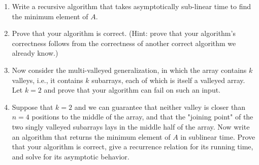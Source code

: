 \documentclass[12pt]{article}
\begin{document}
\begin{enumerate}
    \begin{enumerate}
        \item Write a recursive algorithm that takes asymptotically sub-linear time to find the minimum element of $A$.
        \item Prove that your algorithm is correct. (Hint: prove that your algorithm's correctness follows from the correctness of another correct algorithm we already know.)
        \item Now consider the multi-valleyed generalization, in which the array contains $k$ valleys, i.e., it contains $k$ subarrays, each of which is itself a valleyed array. Let $k = 2$ and prove that your algorithm can fail on such an input.
        \item Suppose that $k = 2$ and we can guarantee that neither valley is closer than $n=4$ positions to the middle of the array, and that the "joining point" of the two singly valleyed subarrays lays in the middle half of the array. Now write an algorithm that returns the minimum element of $A$ in sublinear time. Prove that your algorithm is correct, give a recurrence relation for its running time, and solve for its asymptotic behavior.
    \end{enumerate}
\end{enumerate}
\end{document}
